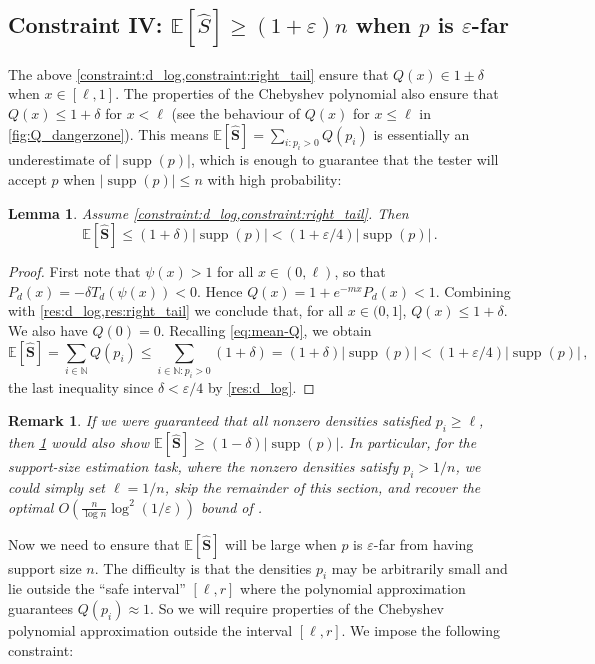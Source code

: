 \documentclass[10pt,a4paper]{article}
\newtheorem{lemma}{Lemma}[section]
\newtheorem{remark}{Remark}[section]
\DeclareMathOperator{\supp}{supp}   %
\newcommand{\Ex}[1]{\bE \left[ #1 \right]}
\newcommand{\bE}{\ensuremath{\mathbb{E}}}
\newcommand{\bN}{\ensuremath{\mathbb{N}}}
\renewcommand{\epsilon}{\varepsilon}
\begin{document}
\subsection{Constraint IV: \texorpdfstring{$\mathbb{E}[\widehat{S}] \geq (1+\epsilon)n$ when $p$ is $\epsilon$-far}{expectation of S hat large when p is epsilon-far}}
\label{section:means}

The above \cref{constraint:d_log,constraint:right_tail} ensure that $Q(x) \in 1 \pm \delta$ when $x
\in [\ell, 1]$. The properties of the Chebyshev polynomial also ensure that $Q(x) \leq 1+\delta$ for
$x < \ell$ (see the behaviour of $Q(x)$ for $x \leq \ell$ in \cref{fig:Q_dangerzone}). This means
$\Ex{\widehat{\bm S}} = \sum_{i : p_i > 0} Q(p_i)$ is essentially an underestimate of $|\supp(p)|$, which is
enough to guarantee that the tester will accept $p$ when $|\supp(p)| \leq n$ with high
probability:
\begin{lemma}
  \label{res:completeness}
  Assume \cref{constraint:d_log,constraint:right_tail}. Then
  \[
      \Ex{\bm{\widehat S}} \le (1 + \delta) |\supp(p)|
      < (1 + \epsilon/4) |\supp(p)| \,.
  \]
\end{lemma}
\begin{proof}
  First note that $\psi(x) > 1$ for all $x \in (0, \ell)$, so that $P_d(x) = -\delta
  T_d(\psi(x)) < 0$. Hence $Q(x) = 1 + e^{-mx} P_d(x) < 1$. Combining with
  \cref{res:d_log,res:right_tail} we conclude that, for all $x \in (0, 1]$, $Q(x) \le 1 + \delta$.
  We also have $Q(0) = 0$. Recalling \eqref{eq:mean-Q}, we obtain
  \[
      \Ex{\bm{\widehat S}}
      = \sum_{i \in \bN} Q(p_i)
      \le \sum_{i \in \bN : p_i > 0} (1 + \delta)
      = (1 + \delta) |\supp(p)|
      < (1 + \epsilon/4) |\supp(p)| \,,
  \]
  the last inequality since $\delta < \epsilon/4$ by \cref{res:d_log}.
\end{proof}

\begin{remark}
\label{remark:recover-wy}
If we were guaranteed that all nonzero densities satisfied $p_i \geq \ell$, then
\cref{res:completeness} would also show $\Ex{\widehat{\bm S}} \geq (1-\delta)|\supp(p)|$. In
particular, for the support-size \emph{estimation} task, where the nonzero densities satisfy $p_i >
1/n$, we could simply set $\ell = 1/n$, skip the remainder of this section, and recover the optimal
$O\left(\frac{n}{\log n} \log^2(1/\epsilon)\right)$ bound of \cite{WY19}. 
\end{remark}
Now we need to ensure that $\Ex{\widehat{\bm S}}$ will be large when $p$ is $\epsilon$-far from
having support size $n$. The difficulty is that the densities $p_i$ may be arbitrarily small and lie
outside the ``safe interval'' $[\ell,r]$ where the polynomial approximation guarantees $Q(p_i)
\approx 1$. So we will require properties of the Chebyshev polynomial approximation outside the
interval $[\ell, r]$. We impose the following constraint:
\end{document}
